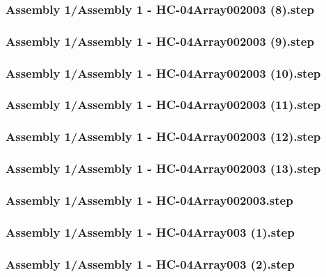 \documentclass[a4paper,12pt]{article}
\begin{document}
\subsubsection{Assembly 1/Assembly 1 - HC-04Array002003 (8).step}

\subsubsection{Assembly 1/Assembly 1 - HC-04Array002003 (9).step}

\subsubsection{Assembly 1/Assembly 1 - HC-04Array002003 (10).step}

\subsubsection{Assembly 1/Assembly 1 - HC-04Array002003 (11).step}

\subsubsection{Assembly 1/Assembly 1 - HC-04Array002003 (12).step}

\subsubsection{Assembly 1/Assembly 1 - HC-04Array002003 (13).step}

\subsubsection{Assembly 1/Assembly 1 - HC-04Array002003.step}

\subsubsection{Assembly 1/Assembly 1 - HC-04Array003 (1).step}

\subsubsection{Assembly 1/Assembly 1 - HC-04Array003 (2).step}

\end{document}
